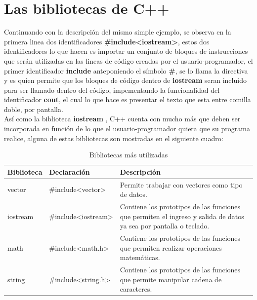 \documentclass[a4paper,12pt,spanish]{article}
\begin{document}
\section{Las bibliotecas de C++}
\label{sec:las-bibliotecas-de}

Continuando con la descripción del mismo simple ejemplo, se observa en
la primera linea dos identificadores \textbf{\#include<iostream>},
estos dos identificadores lo que hacen es importar un conjunto de
bloques de instrucciones que serán utilizadas en las lineas de código
creadas por el usuario-programador, el primer identificador
\textbf{include} anteponiendo el símbolo \textbf{\#}, se lo llama la
directiva y es quien permite que los bloques de código dentro de
\textbf{iostream} seran incluido para ser llamado dentro del código,
impementando la funcionalidad del identificador  \textbf{cout}, el cual lo
que hace es presentar el texto que esta entre comilla doble, por
pantalla.\\

Así como la biblioteca \textbf{iostream} , C++ cuenta con mucho más que
deben ser incorporada en función de lo que el usuario-programador
quiera que su programa realice, alguna de estas bibliotecas son
mostradas en el siguiente cuadro:

\begin{table}[H]
  \centering
  \begin{tabular}[H]{|l|l|p{8cm}|}
    \hline
    Biblioteca & Declaración & Descripción \\ \hline
    vector &  \#include<vector> & Permite trabajar con vectores como
                                  tipo de datos.\\ \hline
    iostream & \#include<iostream> & Contiene los prototipos de las
                                     funciones que permiten el ingreso
                                     y salida de datos ya sea por
                                     pantalla o teclado. \\ \hline
    math &  \#include<math.h> & Contiene los prototipos de las
                                funciones que permiten realizar
                                operaciones matemáticas. \\ \hline
    string & \#include<string.h> & Contiene los prototipos de las
                                   funciones que permite manipular
                                   cadena de caracteres. \\ \hline
  \end{tabular}
  \caption{Bibliotecas más utilizadas}
  \label{tab:bibliotecas}
\end{table}
\end{document}

